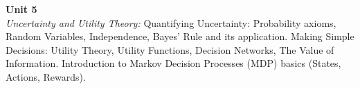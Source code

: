 \vspace{0.3cm}

\noindent\textbf{Unit 5} \\
\textit{Uncertainty and Utility Theory:} Quantifying Uncertainty: Probability axioms, Random Variables, Independence, Bayes' Rule and its application. Making Simple Decisions: Utility Theory, Utility Functions, Decision Networks, The Value of Information. Introduction to Markov Decision Processes (MDP) basics (States, Actions, Rewards).

\newpage
{}